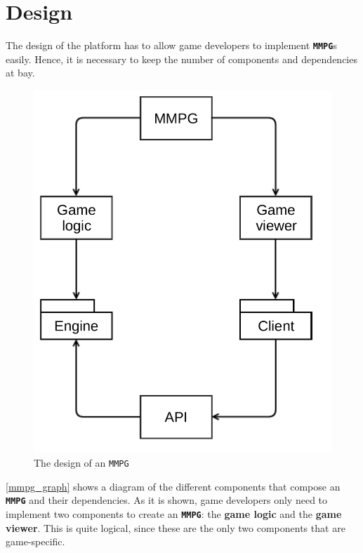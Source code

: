 \documentclass[a4paper,11pt,titlepage,abstract,numbers=noenddot,automark,mnsy,intlimits,rgb,dvipsnames]{report}
\begin{document}
\chapter{Design}
\label{design}
The design of the platform has to allow game developers to implement \textbf{\texttt{MMPG}}s easily. Hence, it is necessary to keep
the number of components and dependencies at bay.
\begin{figure}[H]
\begin{center}
\includegraphics[scale=0.5]{graphs/mmpg_design.pdf}
\end{center}
\caption{The design of an \texttt{MMPG}}
\label{mmpg_graph}
\end{figure}
\autoref{mmpg_graph} shows a diagram of the different components that compose an \textbf{\texttt{MMPG}} and their dependencies. As it is shown,
game developers only need to implement two components to create an \textbf{\texttt{MMPG}}: the \textbf{game logic} and the \textbf{game viewer}. This is
quite logical, since these are the only two components that are game-specific.
\end{document}
